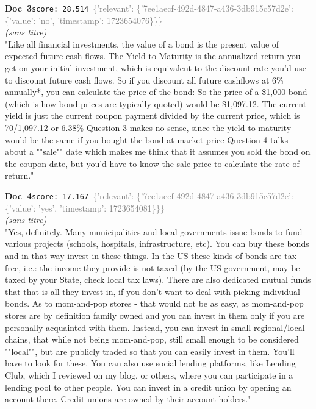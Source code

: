 \documentclass[a4paper,11pt]{article}
\begin{document}
\begin{docenv}
{\footnotesize\textcolor{doccolor}{\textbf{Doc~3}}}\hfill{\tiny\texttt{score:~28.514}}\ {\tiny\textcolor{gray}{\{'relevant': \{'7ee1aecf-492d-4847-a436-3db915c57d2e': \{'value': 'no', 'timestamp': 1723654076\}\}\}}}\\[3pt]
{\small\textit{(sans titre)}}\\[2pt]
\vspace{2pt}
{\footnotesize 
"Like all financial investments, the value of a bond is the present value of expected future cash flows.  The Yield to Maturity is the annualized return you get on your initial investment, which is equivalent to the discount rate you'd use to discount future cash flows. So if you discount all future cashflows at 6\% annually*, you can calculate the price of the bond: So the price of a \$1,000 bond (which is how bond prices are typically quoted) would be \$1,097.12. The current yield is just the current coupon payment divided by the current price, which is 70/1,097.12 or 6.38\% Question 3 makes no sense, since the yield to maturity would be the same if you bought the bond at market price Question 4 talks about a ""sale"" date which makes me think that it assumes you sold the bond on the coupon date, but you'd have to know the sale price to calculate the rate of return."}
\end{docenv}
\begin{docenv}
{\footnotesize\textcolor{doccolor}{\textbf{Doc~4}}}\hfill{\tiny\texttt{score:~17.167}}\ {\tiny\textcolor{gray}{\{'relevant': \{'7ee1aecf-492d-4847-a436-3db915c57d2e': \{'value': 'yes', 'timestamp': 1723654081\}\}\}}}\\[3pt]
{\small\textit{(sans titre)}}\\[2pt]
\vspace{2pt}
{\footnotesize 
"Yes, definitely. Many municipalities and local governments issue bonds to fund various projects (schools, hospitals, infrastructure, etc). You can buy these bonds and in that way invest in these things. In the US these kinds of bonds are tax-free, i.e.: the income they provide is not taxed (by the US government, may be taxed by your State, check local tax laws). There are also dedicated mutual funds that that is all they invest in, if you don't want to deal with picking individual bonds. As to mom-and-pop stores - that would not be as easy, as mom-and-pop stores are by definition family owned and you can invest in them only if you are personally acquainted with them. Instead, you can invest in small regional/local chains, that while not being mom-and-pop, still small enough to be considered ""local"", but are publicly traded so that you can easily invest in them. You'll have to look for these. You can also use social lending platforms, like Lending Club, which I reviewed on my blog, or others, where you can participate in a lending pool to other people. You can invest in a credit union by opening an account there. Credit unions are owned by their account holders."}
\end{docenv}
\end{document}
